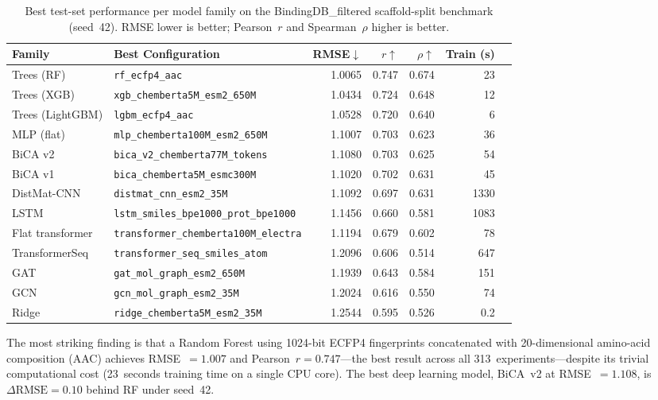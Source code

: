 \documentclass[11pt,twocolumn]{article}
\begin{document}
\begin{table}[htbp]
\centering
\caption{Best test-set performance per model family on the BindingDB\_filtered
  scaffold-split benchmark (seed~42).  RMSE lower is better; Pearson~$r$ and
  Spearman~$\rho$ higher is better.}
\label{tab:leaderboard}
\small
\begin{tabularx}{\linewidth}{lXrrrrr}
\toprule
Family & Best Configuration & RMSE$\downarrow$ & $r$$\uparrow$ & $\rho$$\uparrow$ & Train (s) \\
\midrule
\rowcolor{best}
Trees (RF)      & \texttt{rf\_ecfp4\_aac}           & 1.0065 & 0.747 & 0.674 & 23 \\
Trees (XGB)     & \texttt{xgb\_chemberta5M\_esm2\_650M}  & 1.0434 & 0.724 & 0.648 & 12 \\
Trees (LightGBM)& \texttt{lgbm\_ecfp4\_aac}         & 1.0528 & 0.720 & 0.640 & 6  \\
\rowcolor{good}
MLP (flat)      & \texttt{mlp\_chemberta100M\_esm2\_650M} & 1.1007 & 0.703 & 0.623 & 36 \\
BiCA v2         & \texttt{bica\_v2\_chemberta77M\_tokens} & 1.1080 & 0.703 & 0.625 & 54 \\
BiCA v1         & \texttt{bica\_chemberta5M\_esmc300M}    & 1.1020 & 0.702 & 0.631 & 45 \\
DistMat-CNN     & \texttt{distmat\_cnn\_esm2\_35M}        & 1.1092 & 0.697 & 0.631 & 1330 \\
LSTM            & \texttt{lstm\_smiles\_bpe1000\_prot\_bpe1000} & 1.1456 & 0.660 & 0.581 & 1083 \\
Flat transformer& \texttt{transformer\_chemberta100M\_electra} & 1.1194 & 0.679 & 0.602 & 78 \\
\rowcolor{poor}
TransformerSeq  & \texttt{transformer\_seq\_smiles\_atom} & 1.2096 & 0.606 & 0.514 & 647 \\
GAT             & \texttt{gat\_mol\_graph\_esm2\_650M}    & 1.1939 & 0.643 & 0.584 & 151 \\
GCN             & \texttt{gcn\_mol\_graph\_esm2\_35M}     & 1.2024 & 0.616 & 0.550 & 74  \\
Ridge           & \texttt{ridge\_chemberta5M\_esm2\_35M}  & 1.2544 & 0.595 & 0.526 & 0.2 \\
\bottomrule
\end{tabularx}
\end{table}

The most striking finding is that a Random Forest using 1024-bit ECFP4
fingerprints concatenated with 20-dimensional amino-acid composition (AAC)
achieves RMSE~$=1.007$ and Pearson~$r=0.747$---the best result across all
313~experiments---despite its trivial computational cost (23~seconds training
time on a single CPU core).  The best deep learning model, BiCA~v2 at
RMSE~$=1.108$, is $\Delta\text{RMSE}=0.10$ behind RF under seed~42.
\end{document}
